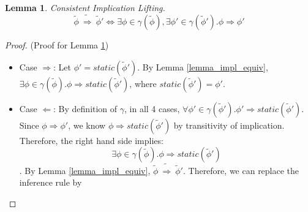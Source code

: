 \documentclass {article}
\newtheorem{lemma}[theorem]{Lemma}
\newcommand{\tphi}{\widetilde{\phi}}
\newcommand{\imp}{\Rightarrow}
\newcommand{\timp}{\ \widetilde{\Rightarrow}\ }
\begin{document}
\begin{lemma}
\label{lemma_impl_lift}
Consistent Implication Lifting.\\
$$\tphi \timp \tphi' \iff \exists \phi \in \gamma(\tphi), \exists \phi' \in \gamma(\tphi'). \phi \imp \phi'$$
\end{lemma}

\begin{proof} (Proof for Lemma \ref{lemma_impl_lift})
\begin{itemize}
    \item Case $\Rightarrow$: Let $\phi' = static(\tphi')$. By Lemma \ref{lemma_impl_equiv}, $\exists \phi \in \gamma(\tphi). \phi \imp static(\tphi')$, where $static(\tphi') = \phi'$. 
    \item Case $\Leftarrow$: By definition of $\gamma$, in all 4 cases, $\forall \phi' \in \gamma(\tphi').\phi' \imp static(\tphi')$. Since $\phi \imp \phi'$, we know $\phi \imp static(\tphi')$ by transitivity of implication. Therefore, the right hand side implies: $$\exists \phi \in \gamma(\tphi).\phi \imp static(\tphi')$$. By Lemma \ref{lemma_impl_equiv}, $\tphi \timp \tphi' $. Therefore, we can replace the inference rule by 
\end{itemize}

\end{proof}
\end{document}
